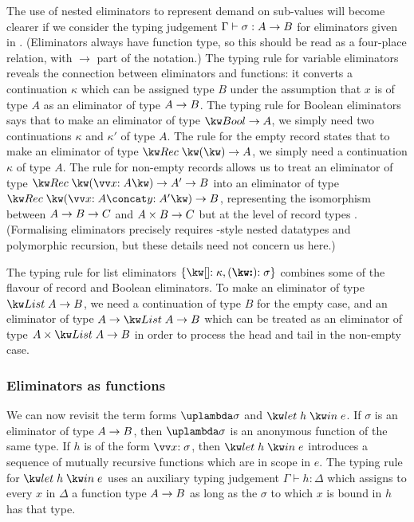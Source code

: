 

The use of nested eliminators to represent demand on sub-values will become clearer if we consider the typing judgement $\Gamma \vdash \sigma: {A}\rightarrow{B}$ for eliminators given in . (Eliminators always have function type, so this should be read as a four-place relation, with $\to$ part of the notation.) The typing rule for variable eliminators reveals the connection between eliminators and functions: it converts a continuation $\kappa$ which can be assigned type $B$ under the assumption that $x$ is of type $A$ as an eliminator of type ${A}\rightarrow{B}$. The typing rule for Boolean eliminators says that to make an eliminator of type $\tyFun{\tyBool}{A}$, we simply need two continuations $\kappa$ and $\kappa'$ of type $A$. The rule for the empty record states that to make an eliminator of type $\tyFun{\tyRec{}}{A}$, we simply need a continuation $\kappa$ of type $A$. The rule for non-empty records allows us to treat an eliminator of type $\tyFun{\tyRec{\vec{\bind{x}{A}}}}{\tyFun{A'}{B}}$ into an eliminator of type $\tyFun{\tyRec{\vec{\bind{x}{A}} \concat \bind{y}{A'}}}{B}$, representing the isomorphism between ${{A}\rightarrow{B}}\rightarrow{C}$ and ${{A}\times{B}}\rightarrow{C}$ but at the level of record types \cite{hinze00}. (Formalising eliminators precisely requires \citeauthor{bird98}-style nested datatypes \cite{bird98} and polymorphic recursion, but these details need not concern us here.)

The typing rule for list eliminators $\elimList{\kappa}{\sigma}$ combines some of the flavour of record and Boolean eliminators. To make an eliminator of type $\tyFun{\tyList{A}}{B}$, we need a continuation of type $B$ for the empty case, and an eliminator of type $\tyFun{A}{\tyFun{\tyList{A}}{B}}$ which can be treated as an eliminator of type $\tyFun{\tyProd{A}{\tyList{A}}}{B}$ in order to process the head and tail in the non-empty case.

\subsubsection{Eliminators as functions}

We can now revisit the term forms $\exLambda{\sigma}$ and $\exLetRecMutual{h}{e}$. If $\sigma$ is an eliminator of type ${A}\rightarrow{B}$, then $\exLambda{\sigma}$ is an anonymous function of the same type. If $h$ is of the form $\vec{\bind{x}{\sigma}}$, then $\exLetRecMutual{h}{e}$ introduces a sequence of mutually recursive functions which are in scope in $e$. The typing rule for $\exLetRecMutual{h}{e}$ uses an auxiliary typing judgement $\Gamma \vdash h : \Delta$ which assigns to every $x$ in $\Delta$ a function type ${A}\rightarrow{B}$ as long as the $\sigma$ to which $x$ is bound in $h$ has that type.

